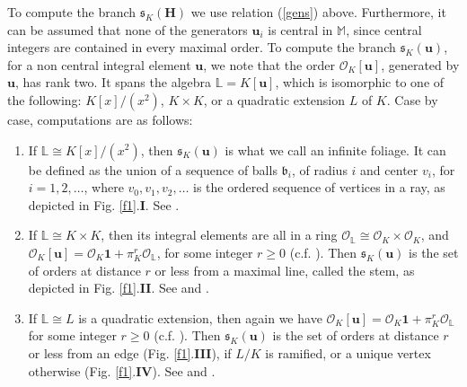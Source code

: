\documentclass{amsart}
\theoremstyle{definition}
\newcommand\lu{\mathbb{L}}
\newcommand\alge{\mathbb{M}}
\newcommand\oink{\mathcal O}
\newcommand\Ha{\mathbf{H}}
\begin{document}
To compute the branch $\mathfrak{s}_K(\Ha)$ we use
relation (\ref{gens}) above. Furthermore,
it can be assumed that none of the generators $\mathbf{u}_i$
is central in $\alge$, since central integers are contained in 
every maximal order. To compute the 
branch $\mathfrak{s}_K(\mathbf{u})$, for a non central 
integral element $\mathbf{u}$, we note that the 
order $\oink_K[\mathbf{u}]$, generated by $\mathbf{u}$, 
has rank two. 
It spans the algebra $\lu=K[\mathbf{u}]$, which is 
isomorphic to one of the following: 
$K[x]/(x^2)$, $K\times K$, or a quadratic extension
$L$ of $K$. Case by case, computations are as 
follows:
\begin{enumerate}
[label=($\diamondsuit$\bf{\arabic*})]
    \item\label{dia1} If $\lu
    \cong K[x]/(x^2)$, then
    $\mathfrak{s}_K(\mathbf{u})$ is what 
    we call an infinite
    foliage. It can be defined as the union of a 
    sequence of balls $\mathfrak{b}_i$, of radius 
    $i$ and center $v_i$, for
    $i=1,2,\dots$, where $v_0,v_1,v_2,\dots$
    is the ordered sequence of vertices in a ray,
    as depicted in Fig. \ref{f1}.\textbf{I}.
     See \cite[Prop. 4.4]{Eichler2}.
    \item\label{dia2} If 
    $\lu\cong K\times K$, then
    its integral elements are all in a ring
    $\oink_\lu\cong \oink_K\times \oink_K$,
    and $\oink_K[\mathbf{u}]=\oink_K\mathbf{1}+
    \pi_K^r\oink_\lu$,
    for some integer $r\geq0$ (c.f. 
    \cite[Lem. 4.1]{Eichler2}). Then 
    $\mathfrak{s}_K(\mathbf{u})$ is
    the set of orders at distance $r$ or less
    from a maximal line, called the stem, 
    as depicted in Fig. \ref{f1}.\textbf{II}.
     See \cite[Prop. 2.4]{Eichler2}
    and \cite[Prop. 4.2]{Eichler2}.
    \item \label{dia3} If $\lu\cong L$ 
    is a quadratic extension, then again 
    we have
    $\oink_K[\mathbf{u}]=\oink_K\mathbf{1}+
    \pi_K^r\oink_\lu$
    for some integer $r\geq0$ 
    (c.f. \cite[Lem. 4.1]{Eichler2}). Then 
    $\mathfrak{s}_K(\mathbf{u})$ is
    the set of orders at distance $r$ or less
    from an edge (Fig. \ref{f1}.\textbf{III}), 
    if $L/K$ is ramified,
    or a unique vertex otherwise 
    (Fig. \ref{f1}.\textbf{IV}).
     See \cite[Prop. 2.4]{Eichler2}
    and \cite[Prop. 4.2]{Eichler2}.
\end{enumerate}
\end{document}
